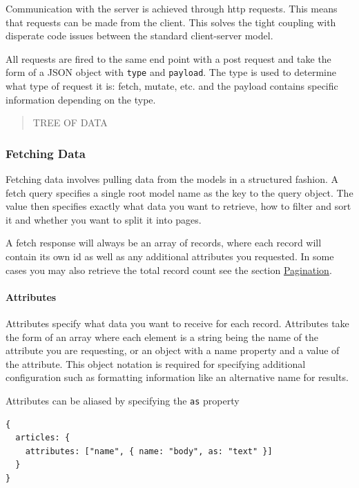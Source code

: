 \documentclass[
  12pt,
]{article}
\newcommand{\passthrough}[1]{#1}
\let\oldparagraph\paragraph
\renewcommand{\paragraph}[1]{\oldparagraph{#1}\mbox{}}
\begin{document}
Communication with the server is achieved through http requests. This
means that requests can be made from the client. This solves the tight
coupling with disperate code issues between the standard client-server
model.

All requests are fired to the same end point with a post request and
take the form of a JSON object with \passthrough{\lstinline!type!} and
\passthrough{\lstinline!payload!}. The type is used to determine what
type of request it is: fetch, mutate, etc. and the payload contains
specific information depending on the type.

\begin{quote}
TREE OF DATA
\end{quote}

\hypertarget{fetching-data}{%
\subsubsection{Fetching Data}\label{fetching-data}}

Fetching data involves pulling data from the models in a structured
fashion. A fetch query specifies a single root model name as the key to
the query object. The value then specifies exactly what data you want to
retrieve, how to filter and sort it and whether you want to split it
into pages.

A fetch response will always be an array of records, where each record
will contain its own id as well as any additional attributes you
requested. In some cases you may also retrieve the total record count
see the section \protect\hyperlink{pagination}{Pagination}.

\hypertarget{attributes-1}{%
\paragraph{Attributes}\label{attributes-1}}

Attributes specify what data you want to receive for each record.
Attributes take the form of an array where each element is a string
being the name of the attribute you are requesting, or an object with a
name property and a value of the attribute. This object notation is
required for specifying additional configuration such as formatting
information like an alternative name for results.

Attributes can be aliased by specifying the \passthrough{\lstinline!as!}
property

\begin{lstlisting}[caption={This query will return all articles each containing the article’s id, name, and body. The body will be aliased under the name "text"}]
{
  articles: {
    attributes: ["name", { name: "body", as: "text" }]
  }
}
\end{lstlisting}
\end{document}
